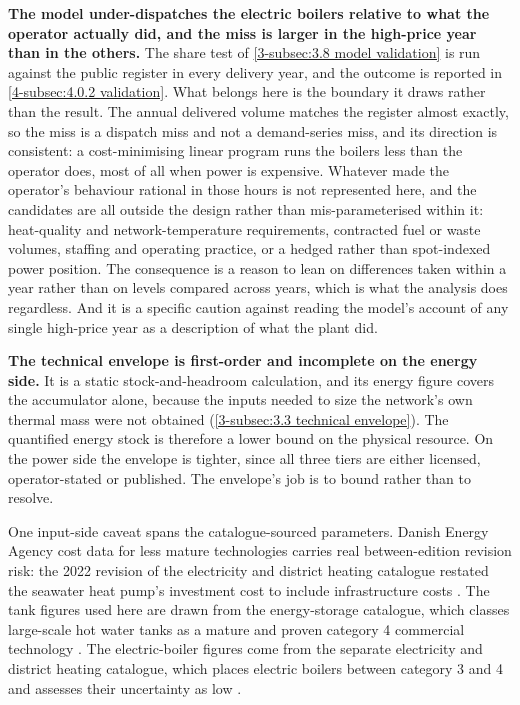 \textbf{The model under-dispatches the electric boilers relative to what the operator actually did, and the miss is larger in the high-price year than in the others.} The share test of \autoref{3-subsec:3.8 model validation} is run against the public register in every delivery year, and the outcome is reported in \autoref{4-subsec:4.0.2 validation}. What belongs here is the boundary it draws rather than the result. The annual delivered volume matches the register almost exactly, so the miss is a dispatch miss and not a demand-series miss, and its direction is consistent: a cost-minimising linear program runs the boilers less than the operator does, most of all when power is expensive. Whatever made the operator's behaviour rational in those hours is not represented here, and the candidates are all outside the design rather than mis-parameterised within it: heat-quality and network-temperature requirements, contracted fuel or waste volumes, staffing and operating practice, or a hedged rather than spot-indexed power position. The consequence is a reason to lean on differences taken within a year rather than on levels compared across years, which is what the analysis does regardless. And it is a specific caution against reading the model's account of any single high-price year as a description of what the plant did.

\textbf{The technical envelope is first-order and incomplete on the energy side.} It is a static stock-and-headroom calculation, and its energy figure covers the accumulator alone, because the inputs needed to size the network's own thermal mass were not obtained (\autoref{3-subsec:3.3 technical envelope}). The quantified energy stock is therefore a lower bound on the physical resource. On the power side the envelope is tighter, since all three tiers are either licensed, operator-stated or published. The envelope's job is to bound rather than to resolve.

One input-side caveat spans the catalogue-sourced parameters. Danish Energy Agency cost data for less mature technologies carries real between-edition revision risk: the 2022 revision of the electricity and district heating catalogue restated the seawater heat pump's investment cost to include infrastructure costs \cite{danish_energy_agency_technology_2024}. The tank figures used here are drawn from the energy-storage catalogue, which classes large-scale hot water tanks as a mature and proven category 4 commercial technology \cite{danish_energy_agency_energy_2025}. The electric-boiler figures come from the separate electricity and district heating catalogue, which places electric boilers between category 3 and 4 and assesses their uncertainty as low \cite{danish_energy_agency_technology_2024}.



\newpage
